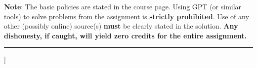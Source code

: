 \documentclass{article}
\begin{document}
\raggedbottom
{}
\vspace*{-0.4cm}
{ \sf \textbf{{\color{red}Note}}: {\color{blue} The basic policies are stated in the course page. Using GPT (or similar tools) to solve problems from the assignment is \textbf{strictly prohibited}. Use of any other (possibly online) source(s) \textbf{must} be clearly stated in the solution. \textbf{Any dishonesty, if caught, will yield zero credits for the entire assignment.}}}\\\vspace*{-0.2cm}
\hrule
\begin{description}[leftmargin=*]
	\item[A. [Perfect Secrecy : \!\!\!\!  $\mathbf{4 \times 4 = 16\ points.}$\!\!\!]]
	

\end{description}
\end{document}
